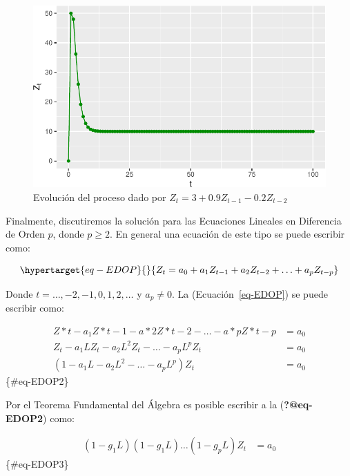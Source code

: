 \documentclass[
  a4paper,
]{article}
\begin{document}
\begin{figure}[H]

\caption{\label{fig-fig23}Evolución del proceso dado por
\(Z_t =3+0.9Z_{t-1}-0.2Z_{t-2}\)}

{\centering \includegraphics{index_files/figure-pdf/fig-fig23-1.pdf}

}

\end{figure}

Finalmente, discutiremos la solución para las Ecuaciones Lineales en
Diferencia de Orden \(p\), donde \(p \geq 2\). En general una ecuación
de este tipo se puede escribir como:

\begin{equation}\protect\hypertarget{eq-EDOP}{}{
Z_t = a_0 + a_1 Z_{t-1} + a_2 Z_{t-2} + \ldots + a_p Z_{t-p}
}\label{eq-EDOP}\end{equation}

Donde \(t = \ldots, -2, -1, 0, 1, 2, \ldots\) y \(a_p \neq 0\). La
(Ecuación~\ref{eq-EDOP}) se puede escribir como:

\begin{align}
Z*t - a_1 Z*{t-1} - a*2 Z*{t-2} - \ldots - a*p Z*{t-p} & = a_0 \nonumber \\
Z_t - a_1 L Z_t - a_2 L^2 Z_t - \ldots - a_p L^p Z_t & = a_0 \nonumber \\
(1 - a_1 L - a_2 L^2 - \ldots - a_p L^p) Z_t & = a_0
\end{align} \{\#eq-EDOP2\}

Por el Teorema Fundamental del Álgebra es posible escribir a la
(\textbf{?@eq-EDOP2}) como:

\begin{align}
(1 - g_1 L)(1 - g_1 L) \ldots (1 - g_p L) Z_t & = a_0
\end{align} \{\#eq-EDOP3\}
\end{document}
